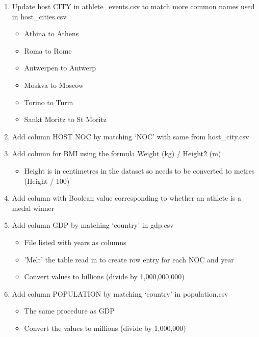 \documentclass[a4 paper, 12pt]{article}
\begin{document}
\begin{enumerate}
            \item Update host CITY in athlete\_events.csv to match more common names used in host\_cities.csv
                \begin{itemize}
                    \item Athina to Athens
                    \item Roma to Rome 
                    \item Antwerpen to Antwerp
                    \item Moskva to Moscow
                    \item Torino to Turin
                    \item Sankt Moritz to St Moritz
                \end{itemize}                 
            \item Add column HOST NOC by matching ‘NOC’ with same from host\_city.csv
            \item Add column for BMI using the formula Weight (kg) / Height\^2 (m) 
               \begin{itemize}
                    \item Height is in centimetres in the dataset so needs to be converted to metres (Height / 100)
                \end{itemize}
            \item Add column with Boolean value corresponding to whether an athlete is a medal winner     
            \item Add column GDP by matching ‘country’ in gdp.csv
                \begin{itemize}
                    \item File listed with years as columns
                    \item 'Melt' the table read in to create row entry for each NOC and year
                    \item Convert values to billions (divide by 1,000,000,000)
                \end{itemize}
            \item Add column POPULATION by matching ‘country’ in population.csv  
                \begin{itemize}
                    \item The same procedure as GDP
                    \item Convert the values to millions (divide by 1,000,000)
                \end{itemize}
        \end{enumerate}
    
\end{document}

